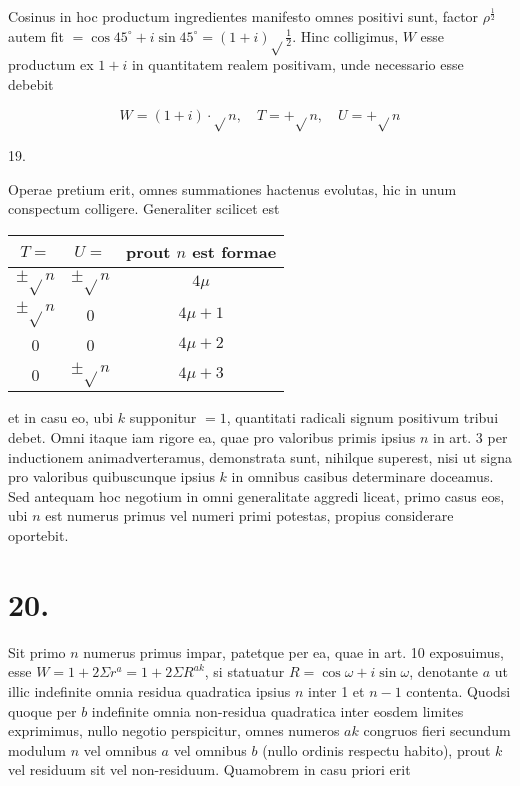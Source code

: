 \documentclass[10pt]{article}
\begin{document}
Cosinus in hoc productum ingredientes manifesto omnes positivi sunt, factor \(\rho^{\frac{1}{2}}\) autem fit \(=\cos 45^{\circ}+i \sin 45^{\circ}=(1+i) \sqrt{ } \frac{1}{2}\). Hinc colligimus, \(W\) esse productum ex \(1+i\) in quantitatem realem positivam, unde necessario esse debebit

\[
W=(1+i) \cdot \sqrt{ } n, \quad T=+\sqrt{ } n, \quad U=+\sqrt{ } n
\]

19.

Operae pretium erit, omnes summationes hactenus evolutas, hic in unum conspectum colligere. Generaliter scilicet est

\begin{center}
\begin{tabular}{|c|c|c|}
\hline
\(T=\) & \(U=\) & prout \(n\) est formae \\
\hline
\(\pm \sqrt{ } n\) & \(\pm \sqrt{ } n\) & \(4 \mu\) \\
\(\pm \sqrt{ } n\) & 0 & \(4 \mu+1\) \\
0 & 0 & \(4 \mu+2\) \\
0 & \(\pm \sqrt{ } n\) & \(4 \mu+3\) \\
\hline
\end{tabular}
\end{center}

et in casu eo, ubi \(k\) supponitur \(=1\), quantitati radicali signum positivum tribui debet. Omni itaque iam rigore ea, quae pro valoribus primis ipsius \(n\) in art. 3 per inductionem animadverteramus, demonstrata sunt, nihilque superest, nisi ut signa pro valoribus quibuscunque ipsius \(k\) in omnibus casibus determinare doceamus. Sed antequam hoc negotium in omni generalitate aggredi liceat, primo casus eos, ubi \(n\) est numerus primus vel numeri primi potestas, propius considerare oportebit.

\section*{20.}
Sit primo \(n\) numerus primus impar, patetque per ea, quae in art. 10 exposuimus, esse \(W=1+2 \Sigma r^{a}=1+2 \Sigma R^{a k}\), si statuatur \(R=\cos \omega+i \sin \omega\), denotante \(a\) ut illic indefinite omnia residua quadratica ipsius \(n\) inter 1 et \(n-1\) contenta. Quodsi quoque per \(b\) indefinite omnia non-residua quadratica inter eosdem limites exprimimus, nullo negotio perspicitur, omnes numeros \(a k\) congruos fieri secundum modulum \(n\) vel omnibus \(a\) vel omnibus \(b\) (nullo ordinis respectu habito), prout \(k\) vel residuum sit vel non-residuum. Quamobrem in casu priori erit
\end{document}
